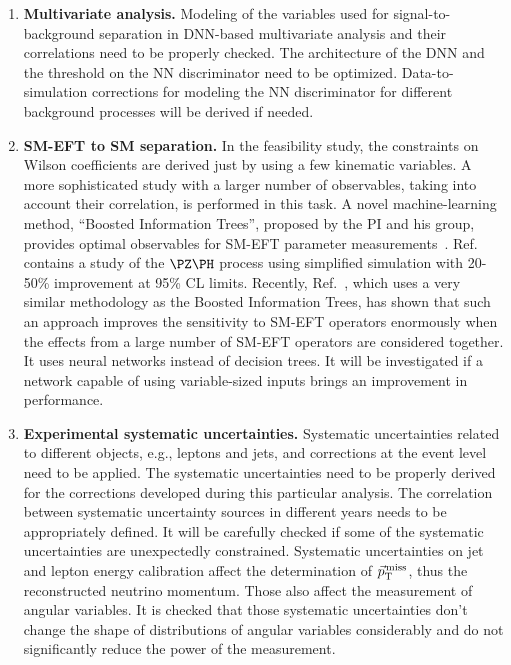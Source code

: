 \documentclass[a4paper,11pt]{article}
\begin{document}
\begin{enumerate}[noitemsep,topsep=0pt]
\item {\bf Multivariate analysis.} Modeling of the variables used for signal-to-background separation in DNN-based multivariate analysis and their correlations need to be properly checked. 
The architecture of the DNN and the threshold on the NN discriminator need to be optimized. 
Data-to-simulation corrections for modeling the NN discriminator for different background processes will be derived if needed. 

\item {\bf SM-EFT to SM separation.} In the feasibility study, the constraints on Wilson coefficients are derived just by using a few kinematic variables.
A more sophisticated study with a larger number of observables, taking into account their correlation, is performed in this task. 
A novel machine-learning method, ``Boosted Information Trees'', proposed by the PI and his group, provides optimal observables for SM-EFT parameter measurements~\cite{Chatterjee:2021nms,Chatterjee:2022oco}. 
Ref.~\cite{Chatterjee:2022oco} contains a study of the $\PZ\PH$ process using simplified simulation with 20-50\% improvement at 95\% CL limits.
Recently, Ref.~\cite{GomezAmbrosio:2022mpm}, which uses a very similar methodology as the Boosted Information Trees, has shown that such an approach improves the sensitivity to SM-EFT operators enormously when the effects from a large number of SM-EFT operators are considered together. 
It uses neural networks instead of decision trees. 
It will be investigated if a network capable of using variable-sized inputs brings an improvement in performance.

\item {\bf Experimental systematic uncertainties.} Systematic uncertainties related to different objects, e.g., leptons and jets, and corrections at the event level need to be applied. 
The systematic uncertainties need to be properly derived for the corrections developed during this particular analysis. 
The correlation between systematic uncertainty sources in different years needs to be appropriately defined. 
It will be carefully checked if some of the systematic uncertainties are unexpectedly constrained. 
Systematic uncertainties on jet and lepton energy calibration affect the determination of ${\vec p}_{\mathrm{T}}^{\kern1pt\text{miss}}$, thus the reconstructed neutrino momentum. Those also affect the measurement of angular variables. It is checked that those systematic uncertainties don't change the shape of distributions of angular variables considerably and do not significantly reduce the power of the measurement.


\end{enumerate}
\end{document}
